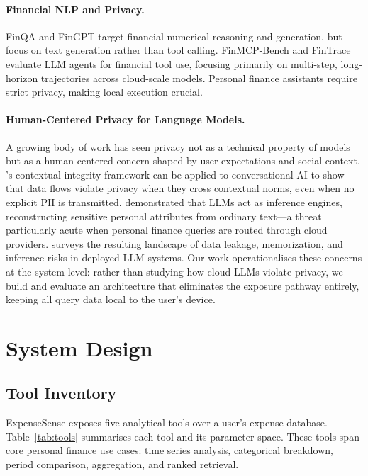 \documentclass[11pt,twocolumn]{article}
\begin{document}
\paragraph{Financial NLP and Privacy.}
FinQA \citep{chen2022finqa} and FinGPT \citep{yang2023fingpt} target
financial numerical reasoning and generation, but focus on text
generation rather than tool calling.
FinMCP-Bench \citep{finmcpbench2026} and FinTrace \citep{fintrace2026}
evaluate LLM agents for financial tool use, focusing primarily on multi-step,
long-horizon trajectories across cloud-scale models.
Personal finance assistants \citep{li2024personal} require strict
privacy, making local execution crucial.

\paragraph{Human-Centered Privacy for Language Models.}
A growing body of work has seen privacy not as a technical property of
models but as a human-centered concern shaped by user expectations and
social context.
\citet{nissenbaum2004privacy}'s contextual integrity framework can be 
applied to conversational AI to show that data flows violate
privacy when they cross contextual norms, even when no explicit PII is
transmitted.
\citet{staab2024memorization} demonstrated that LLMs act as inference
engines, reconstructing sensitive personal attributes from ordinary
text---a threat particularly acute when personal finance queries are routed
through cloud providers.
\citet{yao2024survey} surveys the resulting landscape of data
leakage, memorization, and inference risks in deployed LLM systems.
Our work operationalises these concerns at the system level: rather
than studying how cloud LLMs violate privacy, we build and evaluate an
architecture that eliminates the exposure pathway entirely, keeping
all query data local to the user's device.

\section{System Design}

\subsection{Tool Inventory}

ExpenseSense exposes five analytical tools over a user's expense
database.
Table~\ref{tab:tools} summarises each tool and its parameter space.
These tools span core personal finance use cases: time series
analysis, categorical breakdown, period comparison, aggregation, and ranked retrieval.
\end{document}
